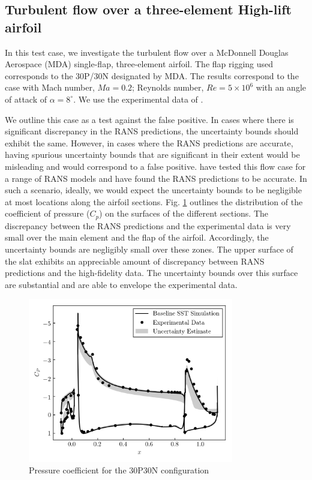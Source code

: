 \subsection{Turbulent flow over a three-element High-lift airfoil}

In this test case, we investigate the turbulent flow over a McDonnell Douglas Aerospace (MDA) single-flap, three-element airfoil. The flap rigging used corresponds to the 30P/30N designated by MDA. The results correspond to the case with Mach number, $Ma=0.2$; Reynolds number, $Re=5 \times 10^6$ with an angle of attack of $\alpha=8^{\circ}$. We use the experimental data of \cite{chin1993}. 

We outline this case as a test against the false positive. In cases where there is significant discrepancy in the RANS predictions, the uncertainty bounds should exhibit the same. However, in cases where the RANS predictions are accurate, having spurious uncertainty bounds that are significant in their extent would be misleading and would correspond to a false positive. \cite{klausmeyer1997} have tested this flow case for a range of RANS models and have found the RANS predictions to be accurate. In such a scenario, ideally, we would expect the uncertainty bounds to be negligible at most locations along the airfoil sections. Fig. \ref{fig:30p30n} outlines the distribution of the coefficient of pressure ($C_p$) on the surfaces of the different sections. The discrepancy between the RANS predictions and the experimental data is very small over the main element and the flap of the airfoil. Accordingly, the uncertainty bounds are negligibly small over these zones. The upper surface of the slat exhibits an appreciable amount of discrepancy between RANS predictions and the high-fidelity data. The uncertainty bounds over this surface are substantial and are able to envelope the experimental data.   

\begin{figure}
\center
\includegraphics[width=0.8\textwidth]{suthesis/images/30p30n_5p5aoa_cp.png}
\caption{Pressure coefficient for the 30P30N configuration\label{fig:30p30n}}
\end{figure}
